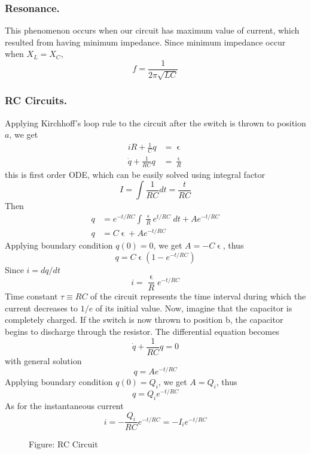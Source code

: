 \documentclass[../../../main.tex]{subfiles}
\begin{document}
\subsubsection{Resonance.} This phenomenon occurs when our circuit has maximum value of current, which resulted from having minimum impedance. Since minimum impedance occur when $X_L=X_C$,
\begin{equation*}
    f=\frac{1}{2\pi\sqrt{LC}}
\end{equation*}

\subsubsection{RC Circuits.} Applying Kirchhoff’s loop rule to the circuit after the switch is thrown to position $a$, we get 
\begin{align*}
    iR+\frac{1}{C}q&=\upvarepsilon\\
    \dot{q}+\frac{1}{RC}q&=\frac{\upvarepsilon}{R}
\end{align*}
this is first order ODE, which can be easily solved using integral factor
\begin{equation*}
    I=\int \frac{1}{RC}dt=\frac{t}{RC}
\end{equation*} 
Then
\begin{align*}
    q&=e^{-t/RC}\int \frac{\upvarepsilon}{R}e^{t/RC}\;dt+Ae^{-t/RC}\\
    q&=C\upvarepsilon+Ae^{-t/RC}
\end{align*}
Applying boundary condition $q(0)=0$, we get $A=-C\upvarepsilon$, thus 
\begin{equation*}
    q=C\upvarepsilon(1-e^{-t/RC})
\end{equation*}
Since $i=dq/dt$
\begin{equation*}
    i=\frac{\upvarepsilon}{R}e^{-t/RC}
\end{equation*}
Time constant $\tau\equiv RC$ of the circuit represents the time interval during which the current decreases to $1/e$ of its initial value. Now, imagine that the capacitor is completely charged. If the switch is now thrown to position b, the capacitor begins to discharge through the resistor. The differential equation becomes
\begin{equation*}   
    \dot{q}+\frac{1}{RC}q=0
\end{equation*}
with general solution 
\begin{equation*}
    q=Ae^{-t/RC}
\end{equation*}
Applying boundary condition $q(0)=Q_i$, we get $A=Q_i$, thus 
\begin{equation*}
    q=Q_ie^{-t/RC}
\end{equation*}
As for the instantaneous current
\begin{equation*}
i=-\frac{Q_i}{RC}e^{-t/RC}=-I_ie^{-t/RC}
\end{equation*}
\begin{figure}
    \centering
    \caption*{Figure: RC Circuit}
\end{figure}
\end{document}
